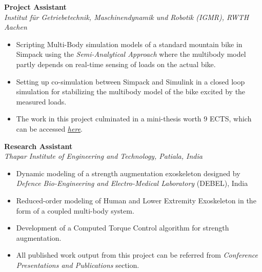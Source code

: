 \vspace{0.1 in}

\large{\textbf{Project Assistant}}
\hfill
\minithesisdate\\
\emph{\large{Institut für Getriebetechnik, Maschinendynamik und Robotik (IGMR), RWTH Aachen}}
\begin{itemize}
\item \large{Scripting Multi-Body simulation models of a standard mountain bike in Simpack using the \emph{Semi-Analytical Approach} where the multibody model partly depends on real-time sensing of loads on the actual bike.}
\item\large{Setting up co-simulation between Simpack and Simulink in a closed loop simulation for stabilizing the multibody model of the bike excited by the measured loads.}
\item\large{The work in this project culminated in a mini-thesis worth 9 ECTS, which can be accessed \href{https://github.com/average-engineer/MiniThesis_IGMR/blob/master/Thesis.pdf}{\large{\textit{here}}}.}
\end{itemize}

\vspace{0.1 in}

\large{\textbf{Research Assistant}}
\hfill
\drdodate\\
\emph{\large{Thapar Institute of Engineering and Technology, Patiala, India}}
\begin{itemize}
\item \large{Dynamic modeling of a strength augmentation exoskeleton designed by \emph{Defence Bio-Engineering and Electro-Medical Laboratory} (DEBEL), India}
\item\large{Reduced-order modeling of Human and Lower Extremity Exoskeleton in the form of a coupled multi-body system.}
\item\large{Development of a Computed Torque Control algorithm for strength augmentation.}
\item\large{All published work output from this project can be referred from \emph{Conference Presentations and Publications} section.}
\end{itemize}

